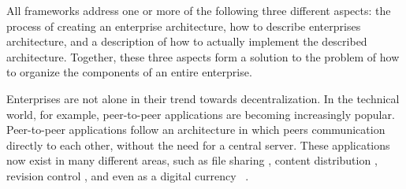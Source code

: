 All frameworks address one or more of the following three different aspects: the process of creating an enterprise architecture, how to describe enterprises architecture, and a description of how to actually implement the described architecture. Together, these three aspects form a solution to the problem of how to organize the components of an entire enterprise.

Enterprises are not alone in their trend towards decentralization. In the technical world, for example, peer-to-peer applications are becoming increasingly popular. Peer-to-peer applications follow an architecture in which peers communication directly to each other, without the need for a central server. These applications now exist in many different areas, such as file sharing \cite{bittorrent}, content distribution \cite{blizzard}, revision control \cite{progit}, and even as a digital currency ~\cite{bitcoin2008}. 




